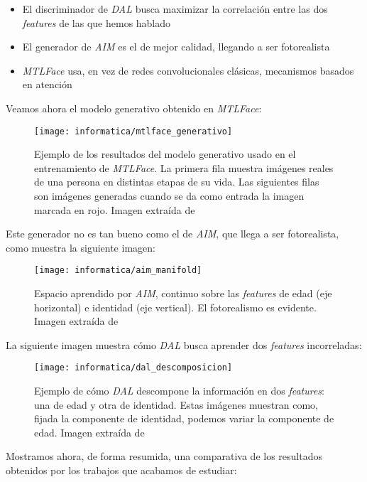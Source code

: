 \begin{itemize}
    \item El discriminador de \textit{DAL} busca maximizar la correlación entre las dos \textit{features} de las que hemos hablado
    \item El generador de \textit{AIM} es el de mejor calidad, llegando a ser fotorealista
    \item \textit{MTLFace} usa, en vez de redes convolucionales clásicas, mecanismos basados en atención
\end{itemize}

Veamos ahora el modelo generativo obtenido en \textit{MTLFace}:

\begin{figure}[H]
    \centering
    \texttt{[image: informatica/mtlface\_generativo]}
    \caption{Ejemplo de los resultados del modelo generativo usado en el entrenamiento de \textit{MTLFace}. La primera fila muestra imágenes reales de una persona en distintas etapas de su vida. Las siguientes filas son imágenes generadas cuando se da como entrada la imagen marcada en rojo. Imagen extraída de \cite{informatica:best_fgnet_model}}
\end{figure}

Este generador no es tan bueno como el de \textit{AIM}, que llega a ser fotorealista, como muestra la siguiente imagen:

\begin{figure}[H]
    \centering
    \texttt{[image: informatica/aim\_manifold]}
    \caption{Espacio aprendido por \textit{AIM}, continuo sobre las \textit{features} de edad (eje horizontal) e identidad (eje vertical). El fotorealismo es evidente. Imagen extraída de \cite{informatica:aim}}
\end{figure}

La siguiente imagen muestra cómo \textit{DAL} busca aprender dos \textit{features} incorreladas:

\begin{figure}[H]
    \centering
    \texttt{[image: informatica/dal\_descomposicion]}
    \caption{Ejemplo de cómo \textit{DAL} descompone la información en dos \textit{features}: una de edad y otra de identidad. Estas imágenes muestran como, fijada la componente de identidad, podemos variar la componente de edad. Imagen extraída de \cite{informatica:dal}}
\end{figure}

Mostramos ahora, de forma resumida, una comparativa de los resultados obtenidos por los trabajos que acabamos de estudiar:

